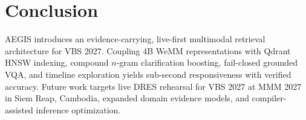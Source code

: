 \documentclass[runningheads,a4paper]{llncs}
\begin{document}
\section{Conclusion}
\label{sec:conclusion}
AEGIS introduces an evidence-carrying, live-first multimodal retrieval architecture for VBS 2027. Coupling 4B WeMM representations with Qdrant HNSW indexing, compound $n$-gram clarification boosting, fail-closed grounded VQA, and timeline exploration yields sub-second responsiveness with verified accuracy. Future work targets live DRES rehearsal for VBS 2027 at MMM 2027 in Siem Reap, Cambodia, expanded domain evidence models, and compiler-assisted inference optimization.



\end{document}
